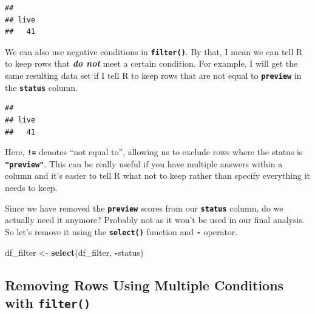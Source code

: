 \documentclass[
]{book}
\newenvironment{Shaded}{\begin{snugshade}}{\end{snugshade}}
\newcommand{\FunctionTok}[1]{\textcolor[rgb]{0.13,0.29,0.53}{\textbf{#1}}}
\newcommand{\NormalTok}[1]{#1}
\newcommand{\OtherTok}[1]{\textcolor[rgb]{0.56,0.35,0.01}{#1}}
\newcommand{\SpecialCharTok}[1]{\textcolor[rgb]{0.81,0.36,0.00}{\textbf{#1}}}
\newcommand{\StringTok}[1]{\textcolor[rgb]{0.31,0.60,0.02}{#1}}
\begin{document}
\begin{verbatim}
## 
## live 
##   41
\end{verbatim}

We can also use negative conditions in \textbf{\texttt{filter()}}. By that, I mean we can tell R to keep rows that \textbf{\emph{do not}} meet a certain condition. For example, I will get the same resulting data set if I tell R to keep rows that are not equal to \textbf{\texttt{preview}} in the \textbf{\texttt{status}} column.

\begin{Shaded}
\end{Shaded}

\begin{verbatim}
## 
## live 
##   41
\end{verbatim}

Here, \textbf{\texttt{!=}} denotes ``not equal to'', allowing us to exclude rows where the status is \textbf{\texttt{"preview"}}. This can be really useful if you have multiple answers within a column and it's easier to tell R what not to keep rather than specify everything it needs to keep.

Since we have removed the \textbf{\texttt{preview}} scores from our \textbf{\texttt{status}} column, do we actually need it anymore? Probably not as it won't be used in our final analysis. So let's remove it using the \textbf{\texttt{select()}} function and \textbf{\texttt{-}} operator.

\begin{Shaded}
\begin{Highlighting}[]
\NormalTok{df\_filter }\OtherTok{\textless{}{-}} \FunctionTok{select}\NormalTok{(df\_filter, }\SpecialCharTok{{-}}\NormalTok{status)}
\end{Highlighting}
\end{Shaded}

\subsection{\texorpdfstring{Removing Rows Using Multiple Conditions with \texttt{filter()}}{Removing Rows Using Multiple Conditions with filter()}}\label{removing-rows-using-multiple-conditions-with-filter}
\end{document}
